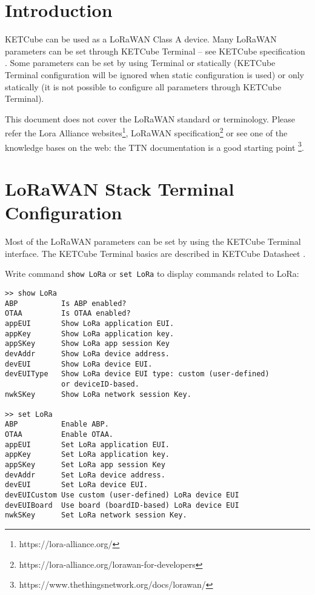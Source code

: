\clearpage
\clearpage
\section{Introduction}
  KETCube can be used as a LoRaWAN Class A device. Many LoRaWAN parameters can be set through KETCube Terminal -- see KETCube specification \cite{ZCU:KETCube:05-2018}. Some parameters can be set by using Terminal or statically (KETCube Terminal configuration will be ignored when static configuration is used) or only statically (it is not possible to configure all parameters through KETCube Terminal).

  This document does not cover the LoRaWAN standard or terminology. Please refer the Lora Alliance websites\footnote{https://lora-alliance.org/}, LoRaWAN specification\footnote{https://lora-alliance.org/lorawan-for-developers} or see one of the knowledge bases on the web: the TTN documentation is a good starting point \footnote{https://www.thethingsnetwork.org/docs/lorawan/}.
  
\clearpage

\section{LoRaWAN Stack Terminal Configuration}
Most of the LoRaWAN parameters can be set by using the KETCube Terminal interface. The KETCube Terminal basics are described in KETCube Datasheet \cite{ZCU:KETCube:05-2018}.

Write command {\tt show LoRa} or {\tt set LoRa} to display commands related to LoRa:

\begin{Verbatim}[frame=single, fontsize=\small]
>> show LoRa
ABP          Is ABP enabled?
OTAA         Is OTAA enabled?
appEUI       Show LoRa application EUI.
appKey       Show LoRa application key.
appSKey      Show LoRa app session Key
devAddr      Show LoRa device address.
devEUI       Show LoRa device EUI.
devEUIType   Show LoRa device EUI type: custom (user-defined) 
             or deviceID-based.
nwkSKey      Show LoRa network session Key.

>> set LoRa
ABP          Enable ABP.
OTAA         Enable OTAA.
appEUI       Set LoRa application EUI.
appKey       Set LoRa application key.
appSKey      Set LoRa app session Key
devAddr      Set LoRa device address.
devEUI       Set LoRa device EUI.
devEUICustom Use custom (user-defined) LoRa device EUI
devEUIBoard  Use board (boardID-based) LoRa device EUI
nwkSKey      Set LoRa network session Key.
\end{Verbatim}

